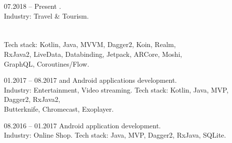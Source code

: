 \documentclass[12pt, a4paper]{article}
\newcommand{\sectionSpace}{16pt}
\begin{document}
\begin{minipage}[t]{0.6\textwidth}
    
    \vspace{\sectionSpace}
    
    \begin{subsec}{}{07.2018 – Present}
        \>  .   \\
        \>  Industry: Travel \& Tourism.                             \lineend
        \>          \\
        \>        \\
        \>             \\
        \>                \lineend
        \>  Tech stack: Kotlin, Java, MVVM,  Dagger2, Koin, Realm,   \\
        \>  RxJava2, LiveData, Databinding, Jetpack, ARCore, Moshi,  \\
        \>  GraphQL, Coroutines/Flow.                                \\
    \end{subsec}
    
    \begin{subsec}{}{01.2017 – 08.2017}
        \>   and  Android applications development.   \\
        \>  Industry: Entertainment, Video streaming.               \lineend
        \>  Tech stack: Kotlin, Java, MVP, Dagger2, RxJava2,                                        \\
        \>  Butterknife, Chromecast, Exoplayer.                                                     \\
    \end{subsec}
    
    \begin{subsec}{}{08.2016 – 01.2017}
        \>   Android application development.    \\
        \>  Industry: Online Shop.                                      \lineend
        \>  Tech stack: Java, MVP, Dagger2, RxJava, SQLite.             \\
    \end{subsec}


\end{minipage}
\end{document}
